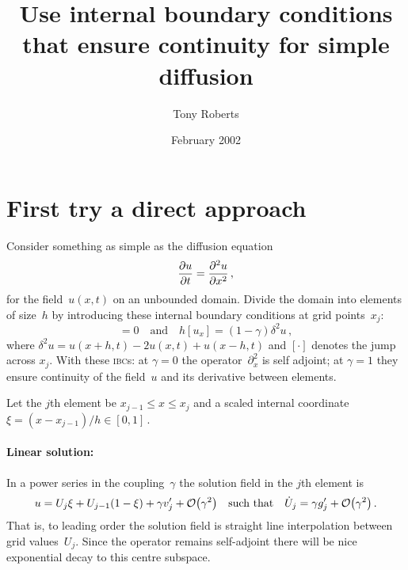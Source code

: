 \documentclass[a5paper]{article}
\title{Use internal boundary conditions that ensure continuity for 
simple diffusion}
\author{Tony Roberts}
\date{February 2002}
\newcommand{\ibc}{\textsc{ibc}}
\begin{document}
\maketitle

\tableofcontents

\section{First try a direct approach}

Consider something as simple as the diffusion equation
\begin{equation}
	\D tu=\DD xu\,,
	\label{eq:diff}
\end{equation}
for the field~$u(x,t)$ on an unbounded domain.  Divide the domain 
into elements of size~$h$ by introducing these internal boundary conditions 
at grid points~$x_j$:
\begin{equation}
	[u]=0
	\quad\mbox{and}\quad
	h\left[u_x\right]=(1-\gamma)\delta^2u\,,
	\label{eq:ibc}
\end{equation}
where $\delta^2u=u(x+h,t)-2u(x,t)+u(x-h,t)$ and $[\cdot]$ denotes the jump 
across $x_j$.
With these \ibc{}s: at $\gamma=0$ the operator~$\partial_x^2$ is self 
adjoint; at $\gamma=1$ they ensure continuity of the field~$u$ and its 
derivative between elements.

Let the $j$th element be $x_{j-1}\leq x\leq x_j$ and a scaled internal 
coordinate $\xi=(x-x_{j-1})/h\in[0,1]$\,.  

\paragraph{Linear solution:} 
In a power series in the coupling~$\gamma$ the solution field in the 
$j$th element is
\begin{equation}
	u=U_j\xi+U_{j-1}(1-\xi)+\gamma v'_j+\Ord{\gamma^2}
	\quad\mbox{such that}\quad
	\dot U_j=\gamma g'_j+\Ord{\gamma^2}\,.
	\label{eq:linear}
\end{equation}
That is, to leading order the solution field is straight line 
interpolation between grid values~$U_j$.  Since the operator remains 
self-adjoint there will be nice exponential decay to this centre 
subspace.
\end{document}
